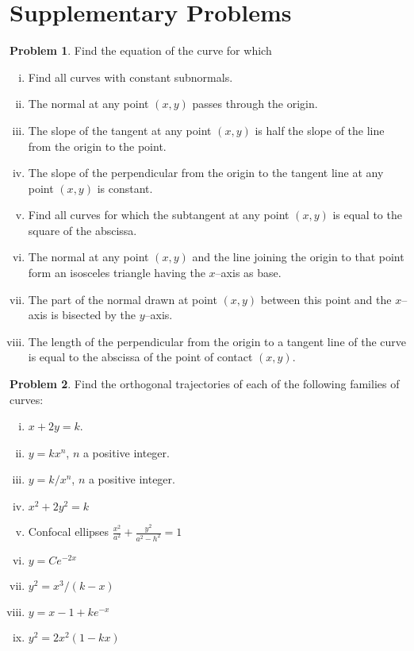 \documentclass{scrartcl}
\theoremstyle{definition}
\newtheorem{problem}{Problem}
\begin{document}


\section*{Supplementary Problems}
\begin{problem}
Find the equation of the curve for which
\begin{enumerate}[(i)]
	\item Find all curves with constant subnormals.
	\item The normal at any point $(x,y)$ passes through the origin.
	\item The slope of the tangent at any point $(x,y)$ is half the slope of the line from the origin to the point.
	\item The slope of the perpendicular from the origin to the tangent line at any point $(x,y)$ is constant.
	\item Find all curves for which the subtangent at any point $(x,y)$ is equal to the square of the abscissa.
	\item The normal at any point $(x,y)$ and the line joining the origin to that point form an isosceles triangle having the $x$--axis as base.
	\item The part of the normal drawn at point $(x,y)$ between this point and the $x$--axis is bisected by the $y$--axis.
	\item The length of the perpendicular from the origin to a tangent line of the curve is equal to the abscissa of the point of contact $(x,y)$.
\end{enumerate}
\end{problem}

\begin{problem}
Find the orthogonal trajectories of each of the following families of
curves: 
\begin{multicols}{2}
\begin{enumerate}[(i)]
	\item $x+2y=k$.
	\item $y=kx^n$, $n$ a positive integer.
	\item $y=k/x^n$, $n$ a positive integer.
	\item $x^2+2y^2=k$
	\item Confocal ellipses $\tfrac{x^2}{a^2}+\tfrac{y^2}{a^2-h^2}=1$
	\item $y=Ce^{-2x}$
	\item $y^2 = x^3/(k-x)$
	\item $y=x-1+ke^{-x}$
	\item $y^2 = 2x^2(1-kx)$
\end{enumerate}
\end{multicols}
\end{problem}
\end{document}
